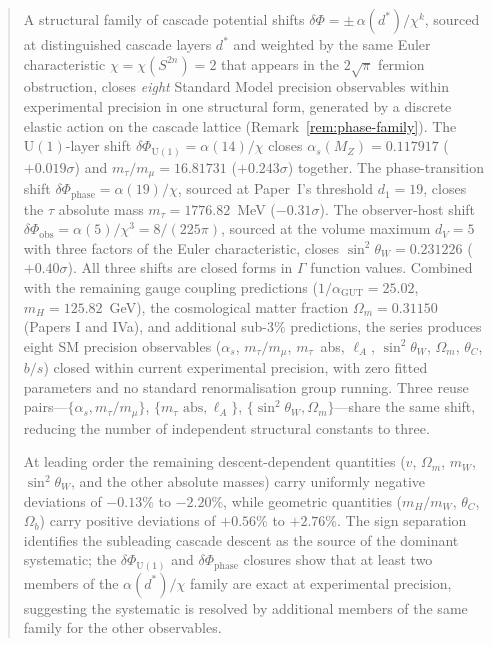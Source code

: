\documentclass[12pt,a4paper]{article}
\begin{document}
\begin{abstract}
A structural family of cascade potential shifts $\delta\Phi = \pm\,\alpha(d^*)/\chi^k$, sourced at distinguished cascade layers $d^*$ and weighted by the same Euler characteristic $\chi=\chi(S^{2n})=2$ that appears in the $2\sqrt{\pi}$ fermion obstruction, closes \emph{eight} Standard Model precision observables within experimental precision in one structural form, generated by a discrete elastic action on the cascade lattice (Remark~\ref{rem:phase-family}). The $\mathrm{U}(1)$-layer shift $\delta\Phi_{\mathrm{U}(1)}=\alpha(14)/\chi$ closes $\alpha_s(M_Z)=0.117917$ ($+0.019\sigma$) and $m_\tau/m_\mu=16.81731$ ($+0.243\sigma$) together. The phase-transition shift $\delta\Phi_{\mathrm{phase}}=\alpha(19)/\chi$, sourced at Paper~I's threshold $d_1=19$, closes the $\tau$ absolute mass $m_\tau=1776.82$~MeV ($-0.31\sigma$). The observer-host shift $\delta\Phi_{\mathrm{obs}}=\alpha(5)/\chi^3 = 8/(225\pi)$, sourced at the volume maximum $d_V=5$ with three factors of the Euler characteristic, closes $\sin^2\theta_W = 0.231226$ ($+0.40\sigma$). All three shifts are closed forms in $\Gamma$ function values. Combined with the remaining gauge coupling predictions ($1/\alpha_{\text{GUT}} = 25.02$, $m_H = 125.82$~GeV), the cosmological matter fraction $\Omega_m = 0.31150$ (Papers I and IVa), and additional sub-3\% predictions, the series produces eight SM precision observables ($\alpha_s$, $m_\tau/m_\mu$, $m_\tau$~abs, $\ell_A$, $\sin^2\theta_W$, $\Omega_m$, $\theta_C$, $b/s$) closed within current experimental precision, with zero fitted parameters and no standard renormalisation group running. Three reuse pairs---$\{\alpha_s,m_\tau/m_\mu\}$, $\{m_\tau\text{ abs},\ell_A\}$, $\{\sin^2\theta_W,\Omega_m\}$---share the same shift, reducing the number of independent structural constants to three.

At leading order the remaining descent-dependent quantities ($v$, $\Omega_m$, $m_W$, $\sin^2\theta_W$, and the other absolute masses) carry uniformly negative deviations of $-0.13\%$ to $-2.20\%$, while geometric quantities ($m_H/m_W$, $\theta_C$, $\Omega_b$) carry positive deviations of $+0.56\%$ to $+2.76\%$. The sign separation identifies the subleading cascade descent as the source of the dominant systematic; the $\delta\Phi_{\mathrm{U}(1)}$ and $\delta\Phi_{\mathrm{phase}}$ closures show that at least two members of the $\alpha(d^*)/\chi$ family are exact at experimental precision, suggesting the systematic is resolved by additional members of the same family for the other observables.
\end{abstract}
\end{document}
